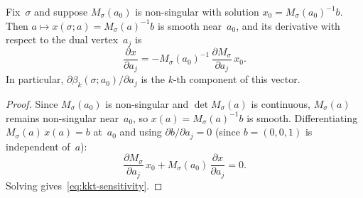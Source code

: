 \begin{unverified}
\begin{lemma}\label{lem:kkt-sensitivity}
Fix~$\sigma$ and suppose $M_\sigma(a_0)$ is non-singular
with solution $x_0 = M_\sigma(a_0)^{-1} b$.
Then $a \mapsto x(\sigma; a) = M_\sigma(a)^{-1} b$
is smooth near~$a_0$, and its derivative with respect to
the dual vertex~$a_j$ is
\begin{equation}\label{eq:kkt-sensitivity}
  \frac{\partial x}{\partial a_j}
  = -M_\sigma(a_0)^{-1}\,
    \frac{\partial M_\sigma}{\partial a_j}\, x_0.
\end{equation}
In particular, $\partial\beta_k(\sigma; a_0) / \partial a_j$
is the $k$-th component of this vector.
\end{lemma}

\begin{proof}
Since $M_\sigma(a_0)$ is non-singular and $\det M_\sigma(a)$ is continuous,
$M_\sigma(a)$ remains non-singular near~$a_0$,
so $x(a) = M_\sigma(a)^{-1} b$ is smooth.
Differentiating $M_\sigma(a)\,x(a) = b$ at~$a_0$
and using $\partial b / \partial a_j = 0$
(since $b = (0, 0, 1)$ is independent of~$a$):
\[
  \frac{\partial M_\sigma}{\partial a_j}\, x_0
  + M_\sigma(a_0)\, \frac{\partial x}{\partial a_j} = 0.
\]
Solving gives~\eqref{eq:kkt-sensitivity}.
\end{proof}
\end{unverified}



